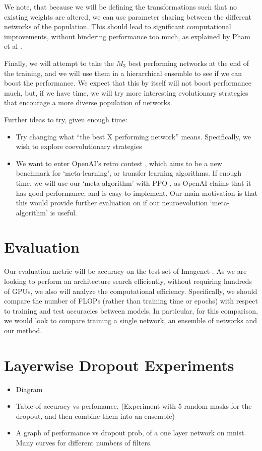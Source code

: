 \documentclass[10pt,twocolumn,letterpaper]{article}
\begin{document}
We note, that because we will be defining the transformations such that no existing weights are altered, we can use parameter sharing between the different networks of the population. This should lead to significant computational improvements, without hindering performance too much, as explained by Pham et al \cite{eas2}.

Finally, we will attempt to take the $M_3$ best performing networks at the end of the training, and we will use them in a hierarchical ensemble to see if we can boost the performance. We expect that this by itself will not boost performance much, but, if we have time, we will try more interesting evolutionary strategies that encourage a more diverse population of networks.

Further ideas to try, given enough time:
\begin{itemize}
	\item Try changing what ``the best X performing network'' means. Specifically, we wish to explore coevolutionary strategies 
    \item We want to enter OpenAI's retro contest \cite{retrocontest}, which aims to be a new benchmark for `meta-learning', or transfer learning algorithms. If enough time, we will use our `meta-algorithm' with PPO \cite{PPO}, as OpenAI claims that it has good performance, and is easy to implement. Our main motivation is that this would provide further evaluation on if our neuroevolution `meta-algorithm' is useful.
\end{itemize}



\section{Evaluation}
Our evaluation metric will be accuracy on the test set of Imagenet \cite{imagenet}. As we are looking to perform an architecture search efficiently, without requiring hundreds of GPUs, we also will analyze the computational efficiency. Specifically, we should compare the number of FLOPs (rather than training time or epochs) with respect to training and test accuracies between models. In particular, for this comparison, we would look to compare training a single network, an ensemble of networks and our method.



{\small


}

\appendix
\section{Layerwise Dropout Experiments}
\begin{itemize}
	\item Diagram
    \item Table of accuracy vs perfomance. (Experiment with 5 random masks for the dropout, and then combine them into an ensemble)
    \item A graph of performance vs dropout prob, of a one layer network on mnist. Many curves for different numbers of filters.
\end{itemize}
\end{document}
